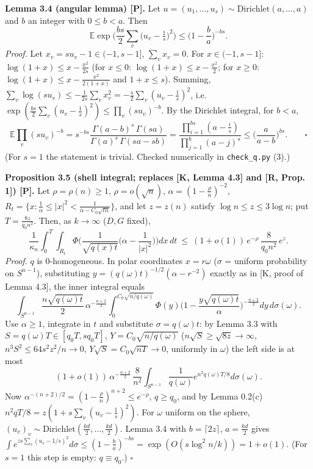 \textbf{Lemma 3.4 (angular lemma) {[}P{]}.} Let \(u=(u_1,\dots,u_s)\sim\mathrm{Dirichlet}(a,\dots,a)\) and \(b\) an integer with \(0\le b<a\). Then
\[\mathbb E\exp\Big(\frac{bs}{2}\sum_v\big(u_v-\tfrac1s\big)^2\Big)\le\Big(1-\frac ba\Big)^{-bs}.\]
\emph{Proof.} Let \(x_v=su_v-1\in(-1,s-1]\), \(\sum_vx_v=0\). For \(x\in(-1,s-1]\): \(\log(1+x)\le x-\frac{x^2}{2s}\) (for \(x\le0\): \(\log(1+x)\le x-\frac{x^2}2\); for \(x\ge0\):
\(\log(1+x)\le x-\frac{x^2}{2(1+x)}\) and \(1+x\le s\)). Summing, \(\sum_v\log(su_v)\le-\frac1{2s}\sum_vx_v^2=-\frac s2\sum_v(u_v-\frac1s)^2\), i.e.
\(\exp(\frac{bs}2\sum_v(u_v-\frac1s)^2)\le\prod_v(su_v)^{-b}\). By the Dirichlet integral, for \(b<a\),
\[\mathbb E\prod_v(su_v)^{-b}=s^{-bs}\frac{\Gamma(a-b)^s\,\Gamma(sa)}{\Gamma(a)^s\,\Gamma(sa-sb)}=\frac{\prod_{i=1}^{bs}(a-\frac is)}{\prod_{j=1}^{b}(a-j)^s}\le\Big(\frac a{a-b}\Big)^{bs}.\qquad\square\]
(For \(s=1\) the statement is trivial. Checked numerically in \texttt{check\_q.py} (3).)

\textbf{Proposition 3.5 (shell integral; replaces {[}K, Lemma 4.3{]} and {[}R, Prop. 1{]}) {[}P{]}.} Let \(\rho=\rho(n)\ge1\), \(\rho=o(\sqrt n)\), \(\alpha=(1-\frac\rho n)^{-2}\),
\(R_t=\{x:\frac1\alpha\le|x|^2<\frac1{\alpha-C_0\sqrt{tn}}\}\), and let \(z=z(n)\) satisfy \(\log n\le z\le 3\log n\); put \(T=\frac{8z}{q_0n^2}\). Then, as \(k\to\infty\) (\(D,G\) fixed),
\[\frac1{\kappa_n}\int_0^T\!\!\int_{R_t}\Phi\Big(\frac{1}{\sqrt{q(x)t}}\Big(\alpha-\frac1{|x|^2}\Big)\Big)dx\,dt\ \le\ (1+o(1))\,e^{-\rho}\,\frac{8}{q_0n^2}\,e^{z}.\]
\emph{Proof.} \(q\) is \(0\)-homogeneous. In polar coordinates \(x=r\omega\) (\(\sigma\) = uniform probability on \(S^{n-1}\)), substituting \(y=(q(\omega)t)^{-1/2}(\alpha-r^{-2})\) exactly as in
{[}K, proof of Lemma 4.3{]}, the inner integral equals
\[\int_{S^{n-1}}\frac{n\sqrt{q(\omega)t}}2\,\alpha^{-\frac{n+2}2}\int_0^{C_0\sqrt{n/q(\omega)}}\Phi(y)\Big(1-\frac{y\sqrt{q(\omega)t}}{\alpha}\Big)^{-\frac{n+2}2}dy\,d\sigma(\omega).\]
Use \(\alpha\ge1\), integrate in \(t\) and substitute \(\sigma=q(\omega)t\): by Lemma 3.3 with \(S=q(\omega)T\in[q_0T,sq_0T]\), \(Y=C_0\sqrt{n/q(\omega)}\)
(\(n\sqrt S\ge\sqrt{8z}\to\infty\), \(n^3S^2\le64s^2z^2/n\to0\), \(Y\sqrt S=C_0\sqrt{nT}\to0\), uniformly in \(\omega\)) the left side is at most
\[(1+o(1))\,\alpha^{-\frac{n+2}2}\,\frac8{n^2}\int_{S^{n-1}}\frac{1}{q(\omega)}e^{n^2q(\omega)T/8}d\sigma(\omega).\]
Now \(\alpha^{-(n+2)/2}=(1-\frac\rho n)^{n+2}\le e^{-\rho}\), \(q\ge q_0\), and by Lemma 0.2(c) \(n^2qT/8=z(1+s\sum_v(u_v-\frac1s)^2)\). For \(\omega\) uniform on the sphere,
\((u_v)_v\sim\mathrm{Dirichlet}(\frac{kd}2,\dots,\frac{kd}2)\). Lemma 3.4 with \(b=\lceil2z\rceil\), \(a=\frac{kd}2\) gives
\(\int e^{zs\sum_v(u_v-1/s)^2}d\sigma\le(1-\frac ba)^{-bs}=\exp(O(s\log^2n/k))=1+o(1)\). (For \(s=1\) this step is empty: \(q\equiv q_0\).) \(\square\)

